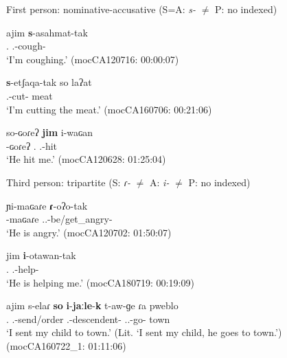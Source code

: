 \documentclass[12pt]{article}
\begin{document}
\begin{exe}
\ex\label{ex:nominative}
First person: nominative-accusative (S=A: \textit{s-} $\neq$ P: no indexed)
\begin{xlist}
\ex 
	 \gll ajim \textbf{s}-asahmat-tak    \\
			        {\First\Sg.\Pron} {\First.\II}-cough-{\Prog}\\
	\trans `I'm coughing.' \hfill (mocCA120716: 00:00:07)\label{ex:nominative_a}
	
\ex 
	  \gll  \textbf{s}-etʃaqa-tak so laʔat  \\
			      {\First.\II}-cut-{\Prog} {\DetTwo} meat\\
	  \trans `I'm cutting the meat.' \hfill (mocCA160706: 00:21:06)\label{ex:nominative_b}
	  
\ex 
\gll so-ɢoɾeʔ \textbf{jim} i-waɢan \\
	{\DetTwo}-ɢoɾeʔ {\First\Sg.\Pron} {\Third.\II}-hit \\
\trans `He hit me.' \hfill (mocCA120628: 01:25:04)\label{ex:nominative_c}
\end{xlist}
\end{exe}

\begin{exe}
\ex\label{ex:tripartite}
Third person: tripartite (S: \textit{ɾ-} $\neq$ A: \textit{i-} $\neq$ P: no indexed)
\begin{xlist}
\ex 
	 \gll ɲi-maɢaɾe \textbf{ɾ}-oʔo-tak    \\
	{\DetSix}-{maɢaɾe} {\Third.\II.\Intr}-be/get\_angry-{\Prog}\\
	\trans `He is angry.' \hfill (mocCA120702: 01:50:07)\label{ex:tript_a}
	
\ex 
	  \gll  jim \textbf{i}-otawan-tak   \\
			 {\First\Sg.\Pron}     {\Third.\II}-help-{\Prog} \\
	  \trans `He is helping me.' \hfill (mocCA180719: 00:19:09)\label{ex:tript_b}
	  
\ex 
\gll ajim s-elaɾ \textbf{so} \textbf{i}-\textbf{jaːle}-\textbf{k}  t-aw-ɡe ɾa pweblo{\Sploan} \\
	{\First\Sg.\Pron}  {\First.\II}-send/order {\DetTwo} {\First\Sg.\Poss}-descendent-{\M}  {\Third.\II.\Intr}-go-{\LocThree} {\DetFour} town \\
\trans `I sent my child to town.' (Lit. `I sent my child, he goes to town.')
\trans  \hfill (mocCA160722\_1: 01:11:06)\label{ex:tript_c}
\end{xlist}
\end{exe}
\end{document}
